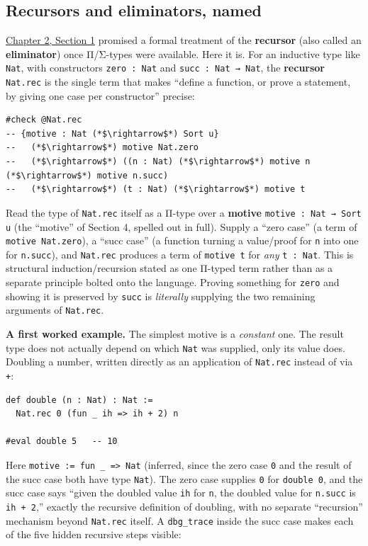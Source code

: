 \subsection{Recursors and eliminators, named}\label{sec:02-terminology-and-coc:02-pi-sigma-and-coc:6}

\hyperref[sec:02-terminology-and-coc:01-terminology:1]{Chapter 2, Section 1} promised a formal treatment of the \textbf{recursor} (also called an \textbf{eliminator}) once Π/Σ-types were available. Here it is. For an inductive type like \texttt{Nat}, with constructors \texttt{zero : Nat} and \texttt{succ : Nat → Nat}, the \textbf{recursor} \texttt{Nat.rec} is the single term that makes ``define a function, or prove a statement, by giving one case per constructor'' precise:

\begin{lstlisting}
#check @Nat.rec
-- {motive : Nat (*$\rightarrow$*) Sort u}
--   (*$\rightarrow$*) motive Nat.zero
--   (*$\rightarrow$*) ((n : Nat) (*$\rightarrow$*) motive n (*$\rightarrow$*) motive n.succ)
--   (*$\rightarrow$*) (t : Nat) (*$\rightarrow$*) motive t
\end{lstlisting}

Read the type of \texttt{Nat.rec} itself as a Π-type over a \textbf{motive} \texttt{motive : Nat → Sort u} (the ``motive'' of Section 4, spelled out in full). Supply a ``zero case'' (a term of \texttt{motive Nat.zero}), a ``succ case'' (a function turning a value/proof for \texttt{n} into one for \texttt{n.succ}), and \texttt{Nat.rec} produces a term of \texttt{motive t} for \emph{any} \texttt{t : Nat}. This is structural induction/recursion stated as one Π-typed term rather than as a separate principle bolted onto the language. Proving something for \texttt{zero} and showing it is preserved by \texttt{succ} is \emph{literally} supplying the two remaining arguments of \texttt{Nat.rec}.

\textbf{A first worked example.} The simplest motive is a \emph{constant} one. The result type does not actually depend on which \texttt{Nat} was supplied, only its value does. Doubling a number, written directly as an application of \texttt{Nat.rec} instead of via \texttt{+}:

\begin{lstlisting}
def double (n : Nat) : Nat :=
  Nat.rec 0 (fun _ ih => ih + 2) n

#eval double 5   -- 10
\end{lstlisting}

Here \texttt{motive := fun \_\allowbreak{} => Nat} (inferred, since the zero case \texttt{0} and the result of the succ case both have type \texttt{Nat}). The zero case supplies \texttt{0} for \texttt{double 0}, and the succ case says ``given the doubled value \texttt{ih} for \texttt{n}, the doubled value for \texttt{n.succ} is \texttt{ih + 2},'' exactly the recursive definition of doubling, with no separate ``recursion'' mechanism beyond \texttt{Nat.rec} itself. A \texttt{dbg\_\allowbreak{}trace} inside the succ case makes each of the five hidden recursive steps visible:

